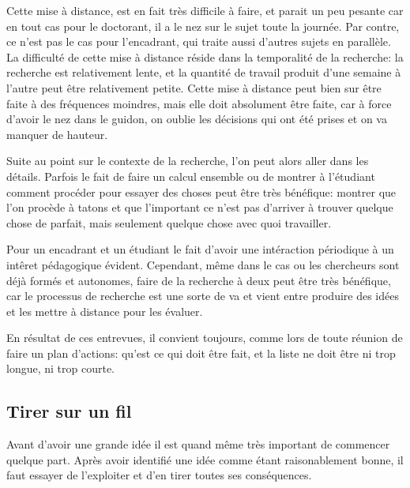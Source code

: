 \documentclass[24pt]{article}
\begin{document}
Cette mise à distance, est en fait très difficile à faire, et parait un peu pesante car en tout cas pour le doctorant, il a le nez sur le sujet toute la journée. 
Par contre, ce n'est pas le cas pour l'encadrant, qui traite aussi d'autres sujets en parallèle. 
La difficulté de cette mise à distance réside dans la temporalité de la recherche: la recherche est relativement lente, et la quantité de travail produit d'une semaine à l'autre peut être relativement petite. 
Cette mise à distance peut bien sur être faite à des fréquences moindres, mais elle doit absolument être faite, car à force d'avoir le nez dans le guidon, on oublie les décisions qui ont été prises et on va manquer de hauteur. 

Suite au point sur le contexte de la recherche, l'on peut alors aller dans les détails. Parfois le fait de faire un calcul ensemble ou de montrer à l'étudiant comment procéder pour essayer des choses peut être très bénéfique: montrer que l'on procède à tatons et que l'important ce n'est pas d'arriver à trouver quelque chose de parfait, mais seulement quelque chose avec quoi travailler.


Pour un encadrant et un étudiant le fait d'avoir une intéraction périodique à un intêret pédagogique évident. Cependant, même dans le cas ou les chercheurs sont déjà formés et autonomes, faire de la recherche à deux peut être très bénéfique, car le processus de recherche est une sorte de va et vient entre produire des idées et les mettre à distance pour les évaluer. 

En résultat de ces entrevues, il convient toujours, comme lors de toute réunion de faire un plan d'actions: 
qu'est ce qui doit être fait, et la liste ne doit être ni trop longue, ni trop courte. 


\subsection{Tirer sur un fil}

Avant d'avoir une grande idée il est quand même très important de commencer quelque part. Après avoir identifié une idée comme étant raisonablement bonne, il faut essayer de l'exploiter et d'en tirer toutes ses conséquences. 
\end{document}
